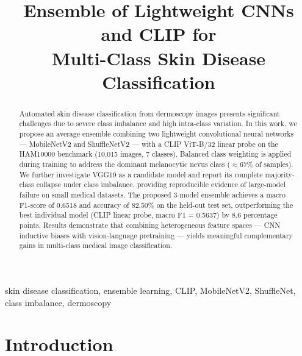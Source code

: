 \documentclass[conference]{IEEEtran}
\begin{document}
\title{Ensemble of Lightweight CNNs and CLIP for\\
Multi-Class Skin Disease Classification}

\author{
}

\maketitle

\begin{abstract}
Automated skin disease classification from dermoscopy images presents
significant challenges due to severe class imbalance and high
intra-class variation. In this work, we propose an average ensemble
combining two lightweight convolutional neural networks ---
MobileNetV2 and ShuffleNetV2 --- with a CLIP ViT-B/32 linear probe
on the HAM10000 benchmark (10,015 images, 7 classes). Balanced class
weighting is applied during training to address the dominant
melanocytic nevus class ($\approx$67\% of samples). We further
investigate VGG19 as a candidate model and report its complete
majority-class collapse under class imbalance, providing reproducible
evidence of large-model failure on small medical datasets. The
proposed 3-model ensemble achieves a macro F1-score of 0.6518 and
accuracy of 82.50\% on the held-out test set, outperforming the best
individual model (CLIP linear probe, macro F1 = 0.5637) by 8.6
percentage points. Results demonstrate that combining heterogeneous
feature spaces --- CNN inductive biases with vision-language
pretraining --- yields meaningful complementary gains in multi-class
medical image classification.
\end{abstract}

\begin{IEEEkeywords}
skin disease classification, ensemble learning, CLIP, MobileNetV2,
ShuffleNet, class imbalance, dermoscopy
\end{IEEEkeywords}

\section{Introduction}
\end{document}
